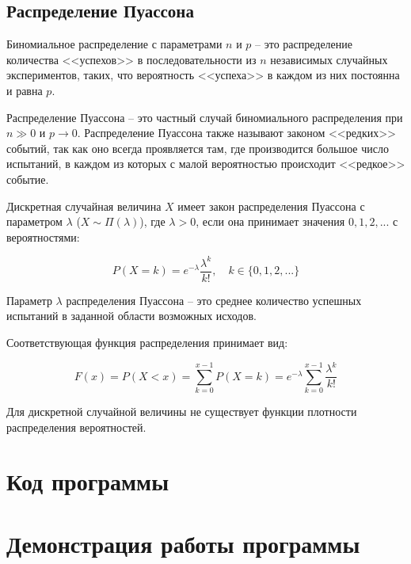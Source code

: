 \documentclass{bmstu}
\begin{document}
\section{Распределение Пуассона}

Биномиальное распределение с параметрами $n$ и $p$ -- это распределение количества <<успехов>> в последовательности из $n$ независимых случайных экспериментов, таких, что вероятность <<успеха>> в каждом из них постоянна и равна $p$.

Распределение Пуассона -- это частный случай биномиального распределения при $n \gg 0$ и $p \to 0$. Распределение Пуассона также называют законом <<редких>> событий, так как оно всегда проявляется там, где производится большое число испытаний, в каждом из которых с малой вероятностью происходит <<редкое>> событие.


Дискретная случайная величина $X$ имеет закон распределения Пуассона с параметром $\lambda$ ($X \sim \Pi(\lambda)$), где $\lambda > 0$, если она принимает значения $0, 1, 2,...$ с вероятностями:

\begin{equation}
	P(X = k)= e^{-\lambda}\frac{\lambda^{k}}{k!}, \quad k \in \{0, 1, 2, ...\}
\end{equation}


Параметр $\lambda$ распределения Пуассона -- это среднее количество успешных испытаний в заданной области возможных исходов. 


Соответствующая функция распределения принимает вид:

\begin{equation}
F(x) = P(X < x) = \sum_{k=0}^{x-1}P(X = k) = e^{-\lambda}\sum_{k=0}^{x-1}\frac{\lambda^{k}}{k!} 
\end{equation}

Для дискретной случайной величины не существует функции плотности распределения вероятностей. 

\chapter{Код программы}


\chapter{Демонстрация работы программы}


\end{document}
